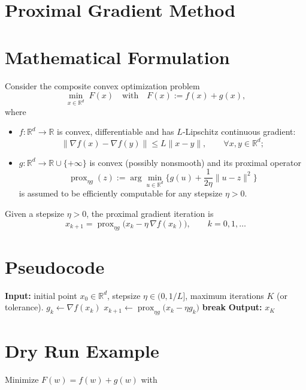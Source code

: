 \documentclass{article}
\newcommand{\prox}{\operatorname{prox}}
\newcommand{\R}{\mathbb{R}}
\begin{document}
\section*{Proximal Gradient Method}

\section*{Mathematical Formulation}
Consider the composite convex optimization problem  
\[
\min_{x\in\R^{d}} \; F(x)\quad\text{with}\quad F(x):=f(x)+g(x),
\]
where  

\begin{itemize}
    \item $f:\R^{d}\!\to\!\R$ is convex, differentiable and has $L$‑Lipschitz continuous gradient:
    \[
    \|\nabla f(x)-\nabla f(y)\|\le L\|x-y\|,\qquad\forall x,y\in\R^{d};
    \]
    \item $g:\R^{d}\!\to\!\R\cup\{+\infty\}$ is convex (possibly nonsmooth) and its proximal operator
    \[
    \prox_{\eta g}(z):=\arg\min_{u\in\R^{d}}\Big\{ g(u)+\frac{1}{2\eta}\|u-z\|^{2}\Big\}
    \]
    is assumed to be efficiently computable for any stepsize $\eta>0$.
\end{itemize}

Given a stepsize $\eta>0$, the proximal gradient iteration is  
\[
\boxed{x_{k+1}= \prox_{\eta g}\!\bigl(x_{k}-\eta\,\nabla f(x_{k})\bigr)},\qquad k=0,1,\dots
\tag{PG}
\]

\section*{Pseudocode}
\begin{algorithm}[H]
\caption{Proximal Gradient Method}
\begin{algorithmic}[1]
\State \textbf{Input:} initial point $x_{0}\in\R^{d}$, stepsize $\eta\in(0,1/L]$,
maximum iterations $K$ (or tolerance).
    \State $g_{k}\gets\nabla f(x_{k})$ \hfill {}
    \State $x_{k+1}\gets\prox_{\eta g}\bigl(x_{k}-\eta g_{k}\bigr)$
        \State \textbf{break}
    \EndIf
\EndFor
\State \textbf{Output:} $x_{K}$
\end{algorithmic}
\end{algorithm}

\section*{Dry Run Example}
Minimize $F(w)=f(w)+g(w)$ with  
\end{document}

